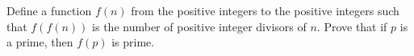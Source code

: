 Define a function $f(n)$ from the positive integers to the positive integers such that $f(f(n))$ is the number of positive integer divisors of $n$. Prove that if $p$ is a prime, then $f(p)$ is prime.